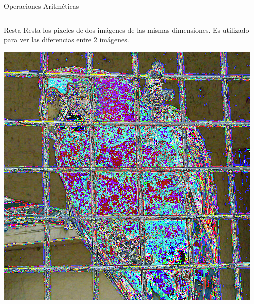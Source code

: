 \documentclass{beamer}
\begin{document}
\begin{frame}{Operaciones Aritméticas}
\begin{columns}
\column[t]{5.9cm}
\begin{center}
\begin{block}{Resta}
Resta los píxeles de dos imágenes de las mismas dimensiones. Es utilizado para ver las diferencias entre 2 imágenes. 
\end{block}
\includegraphics[scale=0.15]{./.Presentation/parrot_substracted}
\end{center}
\end{columns}

\end{frame}
\end{document}

